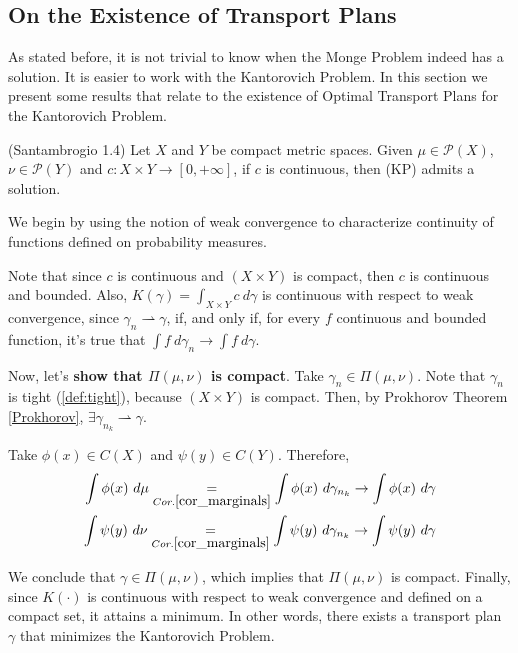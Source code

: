 \subsection{On the Existence of Transport Plans}
As stated before, it is not trivial to know when the Monge Problem
indeed has a solution. It is easier to work with the Kantorovich
Problem. In this section we present some results that relate
to the existence of Optimal Transport Plans for the Kantorovich Problem.

\begin{theorem}(Santambrogio 1.4)
  Let $X$ and $Y$ be compact metric spaces.
  Given $\mu\in \mathcal{P}(X)$, $\nu \in \mathcal P(Y)$ and
  $c:X\times Y \to[0,+\infty]$, if $c$ is continuous, then
  (KP) admits a solution.
  \label{thm:Santambrogio1.4}
\end{theorem}
\begin{prf}
  We begin by using the notion of weak convergence to characterize
  continuity of functions defined on probability measures.

  Note that since $c$ is continuous and $(X \times Y)$ is compact,
  then $c$ is continuous and bounded. Also,
  $K(\gamma) = \int_{X\times Y}c \ d\gamma$ is continuous with respect to weak
  convergence, since
  $\gamma_n \rightharpoonup \gamma$, if, and only if, for every $f$ continuous
  and bounded function, it's true that $\int f \ d\gamma_n \to \int f \ d\gamma$.

  Now, let's \textbf{show that $\Pi(\mu,\nu)$ is compact}.
  Take $\gamma_n \in \Pi(\mu,\nu)$. Note that $\gamma_n$ is tight (\ref{def:tight}),
  because $(X\times Y)$ is compact. Then, by Prokhorov Theorem \ref{Prokhorov},
  $\exists \gamma_{n_k} \rightharpoonup \gamma$.

  Take $\phi(x) \in C(X)$ and $\psi(y) \in C(Y)$. Therefore,
  \begin{equation*}
    \begin{split}
      \int \phi(x) \ d\mu
      \underset{Cor.\ref{cor_marginals}}{=}
      \int\phi(x)\ d\gamma_{n_k}
      \to
      \int \phi(x) \ d\gamma \\
      \int \psi(y) \ d\nu
      \underset{Cor.\ref{cor_marginals}}{=}
      \int\psi(y)\ d\gamma_{n_k}
      \to
      \int \psi(y) \ d\gamma
    \end{split}
  \end{equation*}

  We conclude that $\gamma \in \Pi(\mu,\nu)$, which implies that
  $\Pi(\mu,\nu)$ is compact. Finally, since $K(\cdot)$ is continuous with respect to weak convergence
  and defined on a compact set, it attains a minimum. In other words,
  there exists a transport plan $\gamma$ that minimizes the Kantorovich
  Problem.
\end{prf}


